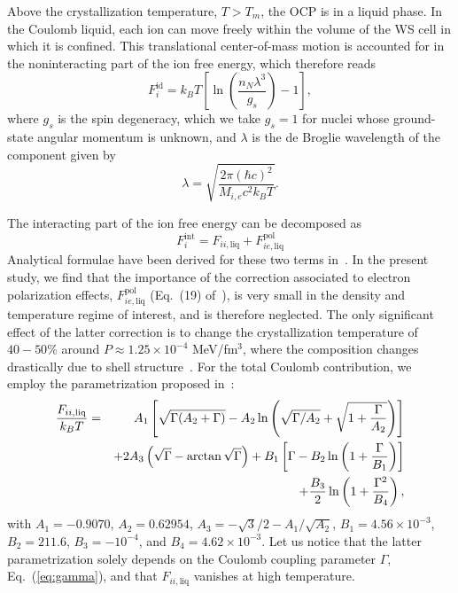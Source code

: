 Above the crystallization temperature, $T > T_m$, the OCP is in a liquid phase.
In the Coulomb liquid, each ion can move freely within the volume of the WS 
cell in which it is confined. This translational center-of-mass motion is
accounted for in the noninteracting part of the ion free energy, which
therefore reads~\cite{Haensel2007}
%
\begin{equation}
  F_i^{\text{id}} = k_B T 
  \left[\ln\left(\frac{n_N\lambda^3}{g_s}\right) - 1\right]\label{eq:fliqid},
\end{equation}
%
where $g_s$ is the spin degeneracy, which we take $g_s=1$ for nuclei whose
ground-state angular momentum is unknown, and $\lambda$ is the de Broglie
wavelength of the component given by
%
\begin{equation}
  \lambda = \sqrt{\frac{2\pi(\hbar c)^2}{M_{i,e}c^2 k_B T}}.
\end{equation}
%

The interacting part of the ion free energy can be decomposed
as~\cite{Fantina2020}
%
\begin{equation}
  F_i^{\text{int}} = F_{ii,\text{liq}} +
  F_{ie,\text{liq}}^{\text{pol}}\label{eq:fiintliq}
\end{equation}
%
Analytical formulae have been derived for these two terms 
in~\cite{Potekhin2000}.
In the present study, we find that the importance of the correction
associated to electron polarization effects, 
$F_{ie,\text{liq}}^{\text{pol}}$ (Eq.~(19) of~\cite{Potekhin2000}), is very 
small in the density and temperature regime of interest, and is therefore 
neglected. The only significant effect of the latter correction is to change 
the crystallization temperature of $40-50\%$ around $P\approx 1.25\times 
10^{-4}$ MeV/fm$^3$, where the composition changes drastically due to 
shell structure~\cite{Fantina2020}.
For the total Coulomb contribution, we employ the parametrization 
proposed in~\cite{Potekhin2000}: 
%
\begin{eqnarray}
  \frac{F_{ii,\text{liq}}}{k_B T} 
  &=& A_1\left[\sqrt{\Gamma(A_2+\Gamma)} - A_2\ln\left(\sqrt{\Gamma/A_2} 
+ \sqrt{1+\frac{\Gamma}{A_2}}\right)\right]\notag\\
  &&+ 2A_3\left(\sqrt{\Gamma} - \arctan\sqrt{\Gamma}\right) 
  + B_1\left[\Gamma-B_2\ln\left(1+\frac{\Gamma}{B_1}\right)\right]\notag\\
  &&+ \frac{B_3}{2}\ln\left(1+\frac{\Gamma^2}{B_4}\right),
\end{eqnarray}
%
with $A_1=-0.9070$, $A_2=0.62954$, $A_3=-\sqrt{3}/2-A_1/\sqrt{A_2}$,
$B_1=4.56\times 10^{-3}$, $B_2=211.6$, $B_3=-10^{-4}$, and $B_4=4.62\times
10^{-3}$. Let us notice that the latter parametrization 
solely depends on the Coulomb coupling parameter $\Gamma$, 
Eq.~(\ref{eq:gamma}), and that $F_{ii,\text{liq}}$ vanishes at high 
temperature.


